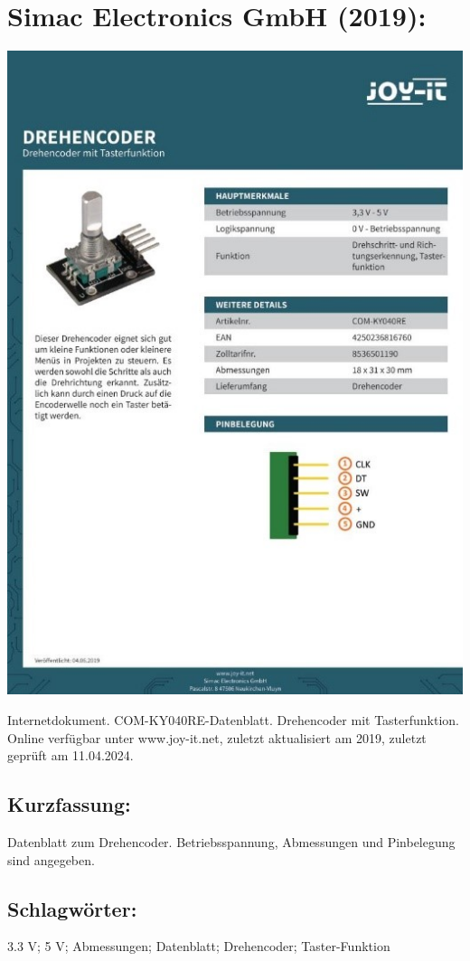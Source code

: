 \section*{Simac Electronics GmbH (2019):}
\begin{minipage}{0.5\textwidth}
	\includegraphics[width=\linewidth]{../Appendix/Literaturverzeichnis/img/Simac.jpg}
\end{minipage}
\hfill
\begin{minipage}{0.48\textwidth}
Internetdokument. COM-KY040RE-Datenblatt. Drehencoder mit Tasterfunktion.
Online verfügbar unter www.joy-it.net, zuletzt aktualisiert am 2019, zuletzt geprüft am 11.04.2024.
\subsection*{Kurzfassung:}
Datenblatt zum Drehencoder. Betriebsspannung, Abmessungen und Pinbelegung sind angegeben.
\subsection*{Schlagwörter:}
3.3 V; 5 V; Abmessungen; Datenblatt; Drehencoder; Taster-Funktion
\end{minipage}
